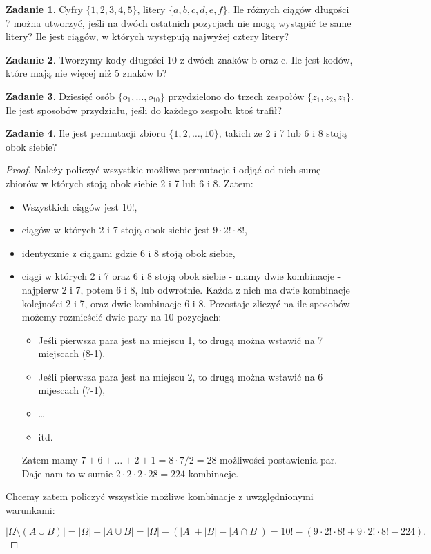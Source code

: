 \documentclass[11pt]{article}
\theoremstyle{definition}
\newtheorem{zadanie}{Zadanie}
\numberwithin{zadanie}{subsection}
\begin{document}
\begin{zadanie}
    Cyfry $\{ 1, 2, 3, 4, 5 \}$, litery $\{ a, b, c, d, e, f \}$. Ile różnych ciągów długości 7 można utworzyć, jeśli na dwóch ostatnich
    pozycjach nie mogą wystąpić te same litery? Ile jest ciągów, w których występują najwyżej cztery litery?
\end{zadanie}

\begin{zadanie}
    Tworzymy kody długości 10 z dwóch znaków b oraz c. Ile jest kodów, które mają nie więcej niż 5 znaków b?
\end{zadanie}

\begin{zadanie}
    Dziesięć osób $\{ o_1,\dots,o_{10} \}$ przydzielono do trzech zespołów $\{ z_1, z_2, z_3 \}$. Ile jest sposobów przydziału, jeśli do każdego zespołu ktoś trafił?
\end{zadanie}

\begin{zadanie}
    Ile jest permutacji zbioru $\{1, 2, \dots, 10\}$, takich że 2 i 7 lub 6 i 8 stoją obok siebie?
\end{zadanie}
\begin{proof}
    Należy policzyć wszystkie możliwe permutacje i odjąć od nich sumę zbiorów w których stoją obok siebie 2 i 7 lub 6 i 8. Zatem:

    \begin{itemize}
        \item Wszystkich ciągów jest $10!$,
        \item ciągów w których 2 i 7 stoją obok siebie jest $9\cdot 2!\cdot 8!$,
        \item identycznie z ciągami gdzie 6 i 8 stoją obok siebie,
        \item ciągi w których 2 i 7 oraz 6 i 8 stoją obok siebie - mamy dwie kombinacje - najpierw 2 i 7, potem 6 i 8, lub odwrotnie. Każda z nich ma dwie kombinacje kolejności 2 i 7, oraz dwie kombinacje 6 i 8. Pozostaje zliczyć na ile sposobów możemy rozmieścić dwie pary na 10 pozycjach:
              \begin{itemize}
                  \item Jeśli pierwsza para jest na miejscu 1, to drugą można wstawić na 7 miejscach (8-1).
                  \item Jeśli pierwsza para jest na miejscu 2, to drugą można wstawić na 6 mijescach (7-1),
                  \item \dots
                  \item itd.
              \end{itemize}

              Zatem mamy $7+6+\dots+2+1 = 8\cdot7/2 = 28$ możliwości postawienia par. Daje nam to w sumie $2\cdot2\cdot2\cdot28 = 224$ kombinacje.

    \end{itemize}

    Chcemy zatem policzyć wszystkie możliwe kombinacje z uwzględnionymi warunkami:

    $$|\Omega\setminus(A\cup B)| = |\Omega| - |A\cup B| = |\Omega| - (|A|+|B|-|A\cap B|) = 10! - (9\cdot2!\cdot8! +9\cdot2!\cdot8!-224).$$
\end{proof}
\end{document}
